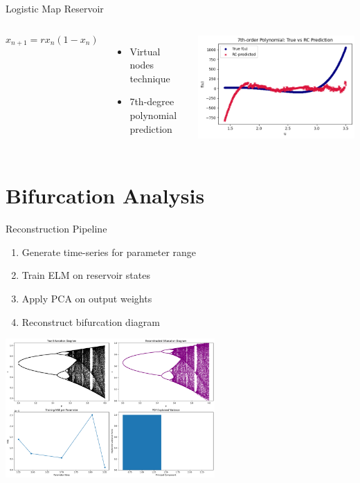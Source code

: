 \documentclass{beamer}
\begin{document}
\begin{frame}{Logistic Map Reservoir}
  \begin{columns}
    \[
    x_{n+1} = rx_n(1-x_n)
    \]
    \begin{itemize}
      \item Virtual nodes technique
      \item 7th-degree polynomial prediction
    \end{itemize}
    
    \includegraphics[width=\textwidth]{figures/logistic_7th_degree.png}
  \end{columns}
\end{frame}

\section{Bifurcation Analysis}
\begin{frame}{Reconstruction Pipeline}
  \begin{enumerate}
    \item Generate time-series for parameter range
    \item Train ELM on reservoir states
    \item Apply PCA on output weights
    \item Reconstruct bifurcation diagram
  \end{enumerate}
  \centering
  \includegraphics[width=0.6\textwidth]{figures/bd_1_results.png}
\end{frame}
\end{document}
